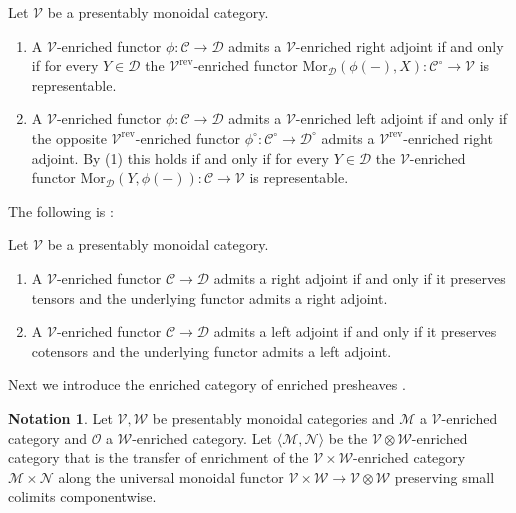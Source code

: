 \documentclass[10pt,oneside]{article}
\numberwithin{equation}{section} %
\numberwithin{figure}{section} %
\theoremstyle{plain}
\theoremstyle{definition}
\newtheorem{notation}[thm]{Notation}
\newcommand{\mC}{{\mathcal C}}
\newcommand{\mD}{{\mathcal D}}
\newcommand{\mM}{{\mathcal M}}
\newcommand{\mN}{{\mathcal N}}
\newcommand{\mO}{{\mathcal O}}
\newcommand{\mV}{{\mathcal V}}
\newcommand{\mW}{{\mathcal W}}
\newcommand{\X}{X}
\newcommand{\Y}{Y}
\newcommand{\rev}{{\mathrm{rev}}}
\newcommand{\ot}{\otimes}
\newcommand{\Mor}{{\mathrm{Mor}}}
\begin{document}
\begin{proposition}
Let $\mV$ be a presentably monoidal category.
\begin{enumerate}[\normalfont(1)]\setlength{\itemsep}{-2pt}
\item A $\mV$-enriched functor $\phi: \mC \to \mD$ admits a $\mV$-enriched right adjoint if and only if for every $\Y \in \mD$ the $\mV^\rev$-enriched functor
$\Mor_\mD(\phi(-),\X): \mC^\circ \to \mV$ is representable.
\item A $\mV$-enriched functor $\phi: \mC \to \mD$ admits a $\mV$-enriched left adjoint if and only if the opposite $\mV^\rev$-enriched functor $\phi^\circ: \mC^\circ \to \mD^\circ$ admits a $\mV^\rev$-enriched right adjoint. By (1) this holds if and only if for every $\Y \in \mD$ the $\mV$-enriched functor
$\Mor_\mD(\Y,\phi(-)): \mC \to \mV$ is representable.
\end{enumerate}
\end{proposition}

The following is \cite[Lemma 2.77]{heine2024bienriched}:

\begin{proposition}\label{adj}
Let $\mV$ be a presentably monoidal category.
\begin{enumerate}[\normalfont(1)]\setlength{\itemsep}{-2pt}
\item A $\mV$-enriched functor $\mC \to \mD$ admits a right adjoint if and only if it preserves tensors and the underlying functor admits a right adjoint.
\item A $\mV$-enriched functor $\mC \to \mD$ admits a left adjoint if and only if it preserves cotensors and the underlying functor admits a left adjoint.
\end{enumerate}

\end{proposition}



Next we introduce the enriched category of enriched presheaves \cite{heine2025equivalence}.


\begin{notation}

Let $\mV, \mW$ be presentably monoidal categories and $\mM$ a $\mV$-enriched category and $\mO$ a $\mW$-enriched category.
Let $\langle \mM, \mN \rangle $ be the $\mV \ot \mW$-enriched category that is the transfer of enrichment of the $\mV \times \mW$-enriched category $\mM \times \mN$ along the universal
monoidal functor $\mV \times \mW \to \mV \ot \mW$ preserving small colimits componentwise.
    
\end{notation}
\end{document}

